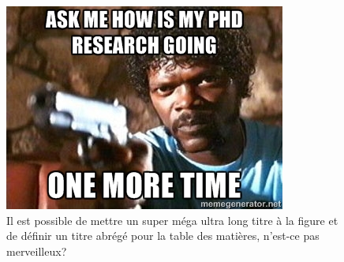 \documentclass[../exemple_master.tex]{subfiles}
\begin{document}


\begin{figure}[!tbh]
\centering

\includegraphics[width=0.5\columnwidth]{img/54701271}

\caption[Petit titre pour la table des matière]{Il est possible de mettre un super méga ultra long titre à la figure et de définir un titre abrégé pour la table des matières, n'est-ce pas merveilleux?}

\label{fig1_exemple}
\end{figure}
\end{document}

